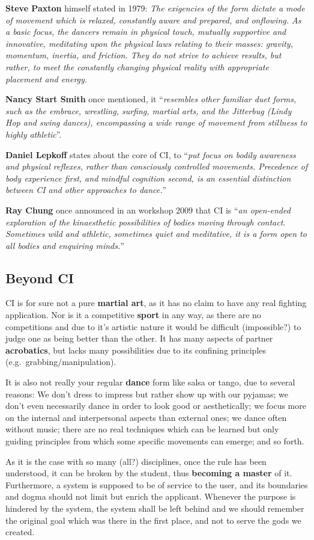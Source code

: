 \textbf{Steve Paxton} himself stated in 1979: \textit{The exigencies of the form dictate a mode of movement which is relaxed, constantly aware and prepared, and onflowing. As a basic focus, the dancers remain in physical touch, mutually supportive and innovative, meditating upon the physical laws relating to their masses: gravity, momentum, inertia, and friction. They do not strive to achieve results, but rather, to meet the constantly changing physical reality with appropriate placement and energy.}

\textbf{Nancy Start Smith} once mentioned, it ``\textit{resembles other familiar duet forms, such as the embrace, wrestling, surfing, martial arts, and the Jitterbug (Lindy Hop and swing dances), encompassing a wide range of movement from stillness to highly athletic}''.

\textbf{Daniel Lepkoff} states about the core of CI, to ``\textit{put focus on bodily awareness and physical reflexes, rather than consciously controlled movements. Precedence of body experience first, and mindful cognition second, is an essential distinction between CI and other approaches to dance.}''


\textbf{Ray Chung} once announced in an workshop 2009 that CI is ``\textit{an open-ended exploration of the kinaesthetic possibilities of bodies moving through contact. Sometimes wild and athletic, sometimes quiet and meditative, it is a form open to all bodies and enquiring minds.}''

\subsection{Beyond CI}\label{subsec:beyond-ci}

CI is for sure not a pure \textbf{martial art}, as it has no claim to have any real fighting application.
Nor is it a competitive \textbf{sport} in any way, as there are no competitions and due to it's artistic nature it would be difficult (impossible?) to judge one as being better than the other.
It has many aspects of partner \textbf{acrobatics}, but lacks many possibilities due to its confining principles (e.g.\ grabbing/manipulation).

It is also not really your regular \textbf{dance} form like salsa or tango, due to several reasons: We don't dress to impress but rather show up with our pyjamas; we don't even necessarily dance in order to look good or aesthetically; we focus more on the internal and interpersonal aspects than external ones; we dance often without music; there are no real techniques which can be learned but only guiding principles from which some specific movements can emerge; and so forth.

As it is the case with so many (all?) disciplines, once the rule has been understood, it can be broken by the student, thus \textbf{becoming a master} of it.
Furthermore, a system is supposed to be of service to the user, and its boundaries and dogma should not limit but enrich the applicant.
Whenever the purpose is hindered by the system, the system shall be left behind and we should remember the original goal which was there in the first place, and not to serve the gods we created.
